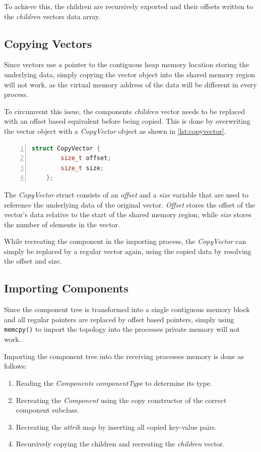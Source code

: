To achieve this, the children are recursively exported and their offsets written to the \emph{children} vectors data array.

\subsection{Copying Vectors}
Since vectors use a pointer to the contiguous heap memory location storing the underlying data, simply copying the vector object into the shared memory region will not work,
as the virtual memory address of the data will be different in every process. \cite{vectors}

To circumvent this issue, the components \emph{children} vector needs to be replaced with an offset based equivalent before being copied.
This is done by overwriting the vector object with a \emph{CopyVector} object as shown in \autoref{lst:copyvector}.

\begin{lstlisting}[language=c++, numbers=left, caption=Component Class, captionpos=b, label={lst:copyvector}]
    struct CopyVector {
        size_t offset;
        size_t size;
    };
\end{lstlisting}

The \emph{CopyVector} struct consists of an \emph{offset} and a \emph{size} variable that are used to reference the underlying data of the original vector.
\emph{Offset} stores the offset of the vector's data relative to the start of the shared memory region, while \emph{size} stores the number of elements in the vector.

While recreating the component in the importing process, the \emph{CopyVector} can simply be replaced by a regular vector again, using the copied data by resolving the offset and size.

\subsection{Importing Components}
Since the component tree is transformed into a single contiguous memory block and all regular pointers are replaced by offset based pointers, simply using \lstinline{memcpy()} to import the topology into the processes private memory will not work.

Importing the component tree into the receiving processes memory is done as follows:

\begin{enumerate}
    \item Reading the \emph{Components} \emph{componentType} to determine its type.
    \item Recreating the \emph{Component} using the copy constructor of the correct component subclass.
    \item Recreating the \emph{attrib} map by inserting all copied key-value pairs.
    \item Recursively copying the children and recreating the \emph{children} vector.
\end{enumerate}

